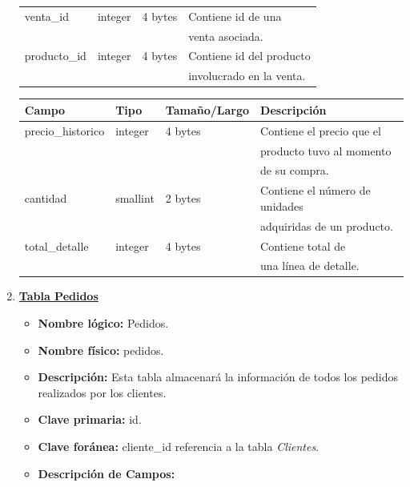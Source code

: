 \documentclass[letterpaper,12pt]{article}
\begin{document}
\begin{enumerate}
\begin{table}[!ht]
\begin{center}
\begin{tabular}{|l|l|l|l|}
venta\_id & integer & 4 bytes&Contiene id de una\\
\mbox{} & \mbox{} & &venta asociada.\\
\hline

producto\_id & integer & 4 bytes&Contiene id del producto\\
\mbox{} & \mbox{} & &involucrado en la venta.\\
\hline

\end{tabular}
\end{center}
\end{table}

\newpage
\begin{table}[!ht]
\begin{center}
\begin{tabular}{|l|l|l|l|}
\hline
\textbf{Campo} \hspace*{2cm} & \textbf{Tipo} & \textbf{Tamaño/Largo} & \textbf{Descripción} \hspace*{3,5cm} \\
\hline

precio\_historico & integer & 4 bytes&Contiene el precio que el\\
\mbox{} & \mbox{} & &producto tuvo al momento\\
\mbox{} & \mbox{} & &de su compra.\\
\hline

cantidad & smallint & 2 bytes&Contiene el número de unidades\\
\mbox{} & \mbox{} & &adquiridas de un producto.\\
\hline

total\_detalle& integer & 4 bytes&Contiene total de\\
\mbox{} & \mbox{} & &una línea de detalle.\\
\hline

\end{tabular}
\end{center}
\end{table}

\newpage

\item \textbf{\underline{Tabla Pedidos}}
\begin{itemize}
\item \textbf{Nombre lógico:} Pedidos.
\item \textbf{Nombre físico:} pedidos.
\item \textbf{Descripción:} Esta tabla almacenará la información de todos los pedidos realizados por los clientes.
\item \textbf{Clave primaria:} id.
\item \textbf{Clave foránea:} cliente\_id referencia a la tabla \emph{Clientes}.
\item\textbf{Descripción de Campos:}
\end{itemize} \vspace{-0.2cm}


\end{enumerate}
\end{document}
